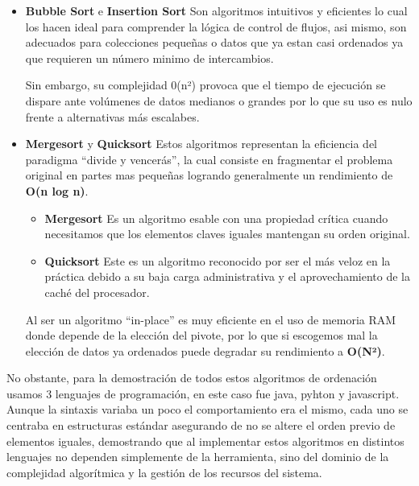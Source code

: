 \documentclass[
  spanish,
  letterpaper,
  DIV=11,
  numbers=noendperiod]{scrreprt}
\begin{document}
\begin{tcolorbox}[enhanced jigsaw, arc=.35mm, bottomrule=.15mm, breakable, colback=white, colframe=quarto-callout-color-frame, left=2mm, leftrule=.75mm, opacityback=0, rightrule=.15mm, toprule=.15mm]

\begin{itemize}
\item
  \textbf{Bubble Sort} e \textbf{Insertion Sort} Son algoritmos
  intuitivos y eficientes lo cual los hacen ideal para comprender la
  lógica de control de flujos, asi mismo, son adecuados para colecciones
  pequeñas o datos que ya estan casi ordenados ya que requieren un
  número minimo de intercambios.

  Sin embargo, su complejidad 0(n²) provoca que el tiempo de ejecución
  se dispare ante volúmenes de datos medianos o grandes por lo que su
  uso es nulo frente a alternativas más escalabes.
\item
  \textbf{Mergesort} y \textbf{Quicksort} Estos algoritmos representan
  la eficiencia del paradigma ``divide y vencerás'', la cual consiste en
  fragmentar el problema original en partes mas pequeñas logrando
  generalmente un rendimiento de \textbf{O(n log n)}.

  \begin{itemize}
  \item
    \textbf{Mergesort} Es un algoritmo esable con una propiedad crítica
    cuando necesitamos que los elementos claves iguales mantengan su
    orden original.
  \item
    \textbf{Quicksort} Este es un algoritmo reconocido por ser el más
    veloz en la práctica debido a su baja carga administrativa y el
    aprovechamiento de la caché del procesador.
  \end{itemize}

  Al ser un algoritmo ``in-place'' es muy eficiente en el uso de memoria
  RAM donde depende de la elección del pivote, por lo que si escogemos
  mal la elección de datos ya ordenados puede degradar su rendimiento a
  \textbf{O(N²)}.
\end{itemize}

\end{tcolorbox}

No obstante, para la demostración de todos estos algoritmos de
ordenación usamos 3 lenguajes de programación, en este caso fue java,
pyhton y javascript. Aunque la sintaxis variaba un poco el
comportamiento era el mismo, cada uno se centraba en estructuras
estándar asegurando de no se altere el orden previo de elementos
iguales, demostrando que al implementar estos algoritmos en distintos
lenguajes no dependen simplemente de la herramienta, sino del dominio de
la complejidad algorítmica y la gestión de los recursos del sistema.
\end{document}
